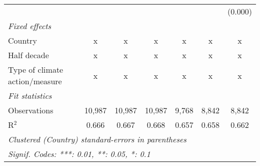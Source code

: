 \begin{tabular}{lcccccc}
                                                 &         &               &                &                &                & (0.000)\\   
   \emph{Fixed effects}\\
   Country                                       & x       & x             & x              & x              & x              & x\\  
   Half decade                                   & x       & x             & x              & x              & x              & x\\  
   Type of climate action/measure                & x       & x             & x              & x              & x              & x\\  
   \midrule \emph{Fit statistics}\\
   Observations                                  & 10,987  & 10,987        & 10,987         & 9,768          & 8,842          & 8,842\\  
   R$^2$                                         & 0.666   & 0.667         & 0.668          & 0.657          & 0.658          & 0.662\\  
   \midrule
   \multicolumn{7}{l}{\emph{Clustered (Country) standard-errors in parentheses}}\\
   \multicolumn{7}{l}{\emph{Signif. Codes: ***: 0.01, **: 0.05, *: 0.1}}\\
\end{tabular}
\par\endgroup


